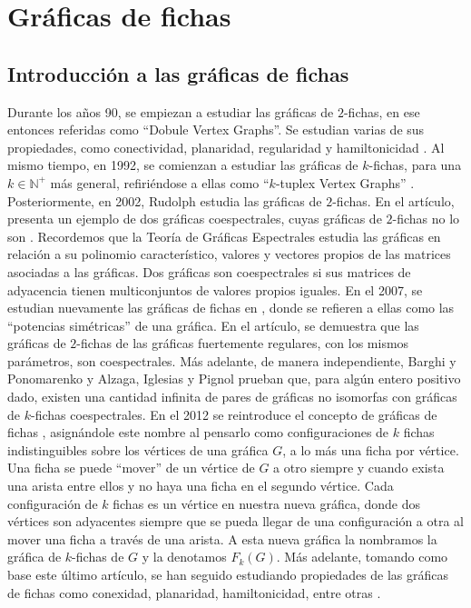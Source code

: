 \chapter{Gr\'aficas de fichas}%
\label{cap:fichass}

\section{Introducci\'on a las gr\'aficas de fichas}%
\label{sec:intro-fichas}


Durante los a\~{n}os 90, se empiezan a estudiar las gr\'aficas de $2$-fichas, en
ese entonces referidas como ``Dobule Vertex Graphs''. Se estudian varias de sus
propiedades, como conectividad, planaridad, regularidad y hamiltonicidad
\cite{alaviPlanarity, alaviDVGraphs, alaviHamilt, zhuConnect}. Al mismo tiempo,
en 1992, se comienzan a estudiar las gr\'aficas de $k$-fichas, para una $k \in
\mathbb{N^{+}}$ m\'as general, refiri\'endose a ellas como ``$k$-tuplex Vertex
Graphs'' \cite{zhuNTuples}. Posteriormente, en 2002, Rudolph estudia las
gr\'aficas de $2$-fichas. En el art\'iculo, presenta un ejemplo de dos
gr\'aficas coespectrales, cuyas gr\'aficas de $2$-fichas no lo son
\cite{rudolphGInv}. Recordemos que la Teor\'ia de Gr\'aficas Espectrales estudia
las gr\'aficas en relaci\'on a su polinomio caracter\'istico, valores y vectores
propios de las matrices asociadas a las gr\'aficas. Dos gr\'aficas son
coespectrales si sus matrices de adyacencia tienen multiconjuntos de valores
propios iguales. En el 2007, se estudian nuevamente las gr\'aficas de fichas en
\cite{audeanetSymPower}, donde se refieren a ellas como las ``potencias
sim\'etricas'' de una gr\'afica. En el art\'iculo, se demuestra que las
gr\'aficas de $2$-fichas de las gr\'aficas fuertemente regulares, con los mismos
par\'ametros, son coespectrales. M\'as adelante, de manera independiente, Barghi
y Ponomarenko \cite{barghi-ponomarenko} y Alzaga, Iglesias y Pignol
\cite{alzagaSymPower} prueban que, para alg\'un entero positivo dado, existen
una cantidad infinita de pares de gr\'aficas no isomorfas con gr\'aficas de
$k$-fichas coespectrales. En el 2012 se reintroduce el concepto de gr\'aficas de
fichas \cite{fabilaToken}, asign\'andole este nombre al pensarlo como
configuraciones de $k$ fichas indistinguibles sobre los v\'ertices de una
gr\'afica $G$, a lo m\'as una ficha por v\'ertice. Una ficha se puede ``mover''
de un v\'ertice de $G$ a otro siempre y cuando exista una arista entre ellos y
no haya una ficha en el segundo v\'ertice. Cada configuraci\'on de $k$ fichas es
un v\'ertice en nuestra nueva gr\'afica, donde dos v\'ertices son adyacentes
siempre que se pueda llegar de una configuraci\'on a otra al mover una ficha a
trav\'es de una arista. A esta nueva gr\'afica la nombramos la gr\'afica de
$k$-fichas de $G$ y la denotamos $F_k(G)$. M\'as adelante, tomando como base
este \'ultimo art\'iculo, se han seguido estudiando propiedades de las
gr\'aficas de fichas como conexidad, planaridad, hamiltonicidad, entre otras
\cite{carballosaRegPlan, leaConnect, riveraHamilt, adameHamilt, leaEConnect}.

